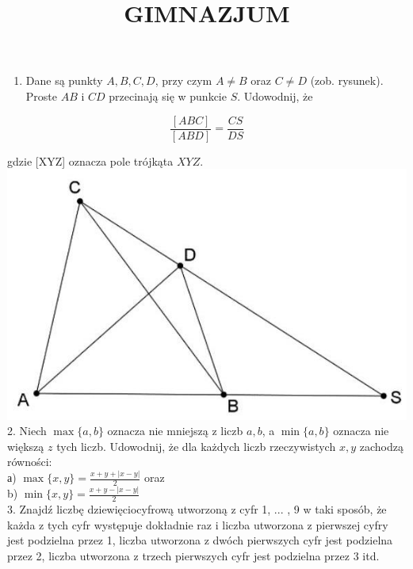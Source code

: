 \documentclass[10pt]{article}
\title{GIMNAZJUM }
\author{}
\date{}
\begin{document}
\maketitle
\begin{enumerate}
  \item Dane są punkty \(A, B, C, D\), przy czym \(A \neq B\) oraz \(C \neq D\) (zob. rysunek). Proste \(A B\) i \(C D\) przecinają się w punkcie \(S\). Udowodnij, że
\end{enumerate}

\[
\frac{[A B C]}{[A B D]}=\frac{C S}{D S}
\]

gdzie [XYZ] oznacza pole trójkąta \(X Y Z\).\\
\includegraphics[max width=\textwidth, center]{2024_11_21_8d7e1e416accc1d3f745g-1(1)}\\
2. Niech \(\max \{a, b\}\) oznacza nie mniejszą z liczb \(a, b\), a \(\min \{a, b\}\) oznacza nie większą \(z\) tych liczb. Udowodnij, że dla każdych liczb rzeczywistych \(x, y\) zachodzą równości:\\
а) \(\max \{x, y\}=\frac{x+y+|x-y|}{2}\) oraz\\
b) \(\min \{x, y\}=\frac{x+y-|x-y|}{2}\)\\
3. Znajdź liczbę dziewięciocyfrową utworzoną z cyfr 1, ... , 9 w taki sposób, że każda z tych cyfr występuje dokładnie raz i liczba utworzona z pierwszej cyfry jest podzielna przez 1, liczba utworzona z dwóch pierwszych cyfr jest podzielna przez 2, liczba utworzona z trzech pierwszych cyfr jest podzielna przez 3 itd.
\end{document}
